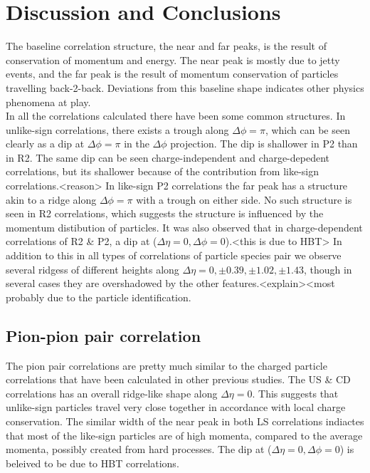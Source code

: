 \documentclass[12pt,a4paper,twoside]{report}
\begin{document}
\chapter{Discussion and Conclusions}\label{Ch:Conclusions}
The baseline correlation structure, the near and far peaks, is the result of conservation of momentum and energy. The near peak is mostly due to jetty events, and the far peak is the result of momentum conservation of particles travelling back-2-back. Deviations from this baseline shape indicates other physics phenomena at play.\\
In all the correlations calculated there have been some common structures. In unlike-sign correlations, there exists a trough along $\Delta\phi=\pi$, which can be seen clearly as a dip at $\Delta\phi=\pi$ in the $\Delta\phi$ projection. The dip is shallower in P2 than in R2. The same dip can be seen charge-independent and charge-depedent correlations, but its shallower because of the contribution from like-sign correlations.<reason> In like-sign P2 correlations the far peak has a structure akin to a ridge along $\Delta\phi=\pi$ with a trough on either side. No such structure is seen in R2 correlations, which suggests the structure is influenced by the momentum distibution of particles. It was also observed that in charge-dependent correlations of R2 \& P2, a dip at ($\Delta\eta=0,\Delta\phi=0$).<this is due to HBT> In addition to this in all types of correlations of particle species pair we observe several ridgess of different heights along $\Delta\eta=0, \pm0.39, \pm1.02, \pm1.43$, though in several cases they are overshadowed by the other features.<explain><most probably due to the particle identification.\\
\section{Pion-pion pair correlation}
The pion pair correlations are pretty much similar to the charged particle correlations that have been calculated in other previous studies. The US \& CD correlations has an overall ridge-like shape along $\Delta\eta=0$. This suggests that unlike-sign particles travel very close together in accordance with local charge conservation. The similar width of the near peak in both LS correlations indiactes that most of the like-sign particles are of high momenta, compared to the average momenta, possibly created from hard processes. The dip at ($\Delta\eta=0,\Delta\phi=0$) is beleived to be due to HBT correlations.
\end{document}
